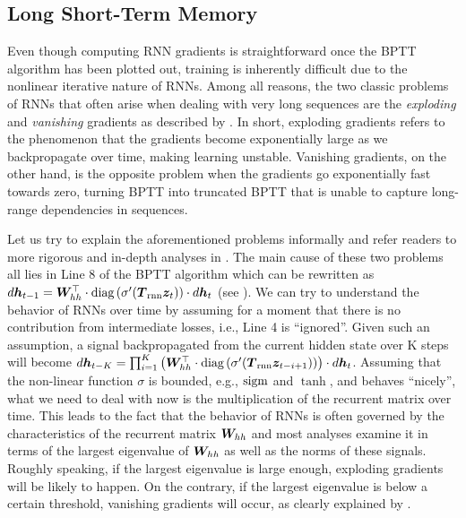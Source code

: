 \subsection{Long Short-Term Memory} %
\label{subsec:LSTM}
Even though computing RNN gradients is straightforward once 
the BPTT algorithm has been plotted out, training is inherently difficult due to the nonlinear
iterative nature of RNNs. Among all reasons, 
the two classic problems of RNNs that often arise when dealing with very long sequences are the {\it
exploding} and {\it vanishing} gradients as
described by . In short, exploding gradients refers to the
phenomenon that the gradients become exponentially large as we backpropagate
over time, making learning unstable. Vanishing gradients, on the
other hand, is the opposite problem when the gradients go exponentially fast
towards zero, turning BPTT into truncated BPTT that is unable to capture long-range
dependencies in sequences. 

Let us try to explain the aforementioned problems informally and 
refer readers to more rigorous and in-depth analyses in \cite{Bengio-trnn94,lstm97,MartensS11,pascanu13}.
The main cause of these two problems all lies in Line 8 of the BPTT
algorithm which can be rewritten as
$d\bm{h}_{t-1} = \bm{W}_{hh}^\top \cdot \text{diag}\left(\sigma'(\mbox{\boldmath{$T$}}_{\text{rnn}} \bm{z}_{t})\right) \cdot
d\bm{h}_{t}$ (see ). We can try to understand the behavior of RNNs over time by assuming
for a moment that there is no contribution from intermediate losses, i.e., Line 4
is ``ignored''. Given such an assumption, a signal backpropagated from the current hidden state over K
steps will become 
$d\bm{h}_{t-K} = \prod_{i=1}^{K} \left(\bm{W}_{hh}^\top \cdot \text{diag}\left(\sigma'(\mbox{\boldmath{$T$}}_{\text{rnn}}
\bm{z}_{t-i+1})\right)\right) \cdot
d\bm{h}_{t}$. Assuming that the non-linear function $\sigma$ is bounded, e.g.,
$\operatorname{sigm}$ and $\tanh$, and behaves ``nicely'', what we need to deal with now is
the multiplication of the recurrent matrix over time.
This leads to the fact that the behavior of RNNs is often governed by the characteristics of the recurrent matrix
$\bm{W}_{hh}$ and most analyses examine it in terms of the largest eigenvalue of
$\bm{W}_{hh}$ as well as the norms of these signals. Roughly speaking, if the largest eigenvalue
is large enough, exploding gradients will be likely to happen. On the contrary,
if the largest eigenvalue is below a certain threshold, vanishing gradients
will occur, as clearly explained by .

